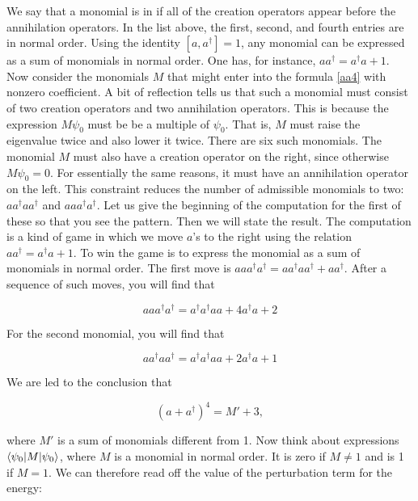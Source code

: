 We say that a monomial is in  if all of the creation operators appear before the annihilation operators.  In the list above, the first, second, and fourth entries are in normal order.  Using the identity $[a,a^\dagger] = 1$, any monomial can be expressed as a sum of monomials in normal order.  One has, for instance, $aa^\dagger = a^\dagger a + 1$.  Now consider the monomials $M$ that might enter into the formula \eqref{aa4} with nonzero coefficient.  A bit of reflection tells us that such a monomial must consist of two creation operators and two annihilation operators.  This is because the expression $M\psi_0$ must be be a multiple of $\psi_0$.  That is, $M$ must raise the eigenvalue twice and also lower it twice. There are six such monomials. The monomial $M$ must also have a creation operator on the right, since otherwise $M\psi_0 = 0$.  For essentially the same reasons, it must have an annihilation operator on the left.  This constraint reduces the number of admissible monomials to two: $aa^\dagger aa^\dagger$ and 
$aaa^\dagger a^\dagger$.  Let us give the beginning of the computation for the first of these so that you see the pattern.  Then we will state the result. The computation is a kind of game in which we move $a$'s to the right using the relation $ a a^\dagger = a^\dagger a + 1$.  To win the game is to express the monomial as a sum of monomials in normal order.  The first move is $aaa^\dagger a^\dagger = aa^\dagger a a^\dagger + aa^\dagger$.  After a sequence of such moves, you will find that

\begin{equation}
aaa^\dagger a^\dagger = a^\dagger a^\dagger  aa + 4a^\dagger a + 2
\end{equation}

For the second monomial, you will find that

\begin{equation}
aa^\dagger a a^\dagger =  a^\dagger a^\dagger  aa + 2a^\dagger a + 1
\end{equation}

We are led to the conclusion that

\begin{equation}
(a + a^\dagger )^4 = M' + 3,
\end{equation}

where $M'$ is a sum of monomials different from 1.
Now think about expressions $\langle \psi_0 | M | \psi_0 \rangle$, where
$M$ is a  monomial in normal order.  It is zero if $M \ne 1$ and
is 1 if  $M = 1$.  We can therefore read off the value of the perturbation term for the energy:


